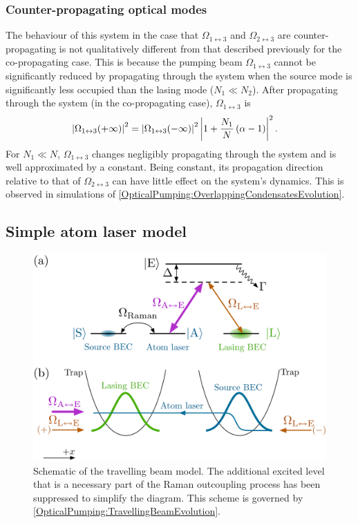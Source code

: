 \subsubsection{Counter-propagating optical modes}
The behaviour of this system in the case that $\Omega_{1\leftrightarrow 3}$ and $\Omega_{2\leftrightarrow 3}$ are counter-propagating is not qualitatively different from that described previously for the co-propagating case.  This is because the pumping beam $\Omega_{1\leftrightarrow 3}$ cannot be significantly reduced by propagating through the system when the source mode is significantly less occupied than the lasing mode ($N_1 \ll N_2$).  After propagating through the system (in the co-propagating case), $\Omega_{1\leftrightarrow 3}$ is
\begin{align}
    \left|\Omega_{1\leftrightarrow 3}(+\infty)\right|^2 &= \left|\Omega_{1\leftrightarrow 3}(-\infty)\right|^2 \left|1 + \frac{N_1}{N}\left(\alpha - 1\right)\right|^2.
\end{align}
For $N_1 \ll N$, $\Omega_{1\leftrightarrow 3}$ changes negligibly propagating through the system and is well approximated by a constant.  Being constant, its propagation direction relative to that of $\Omega_{2\leftrightarrow 3}$ can have little effect on the system's dynamics.  This is observed in simulations of \eqref{OpticalPumping:OverlappingCondensatesEvolution}.


\subsection{Simple atom laser model}
\label{OpticalPumping:SimpleModels:AtomLaserModel}

\begin{figure}
    \centering
    \includegraphics[width=12cm]{TravellingBeamModel}
    \caption{Schematic of the travelling beam model.  The additional excited level that is a necessary part of the Raman outcoupling process has been suppressed to simplify the diagram.  This scheme is governed by \eqref{OpticalPumping:TravellingBeamEvolution}.}
    \label{OpticalPumping:TravellingBeamModel}
\end{figure}


